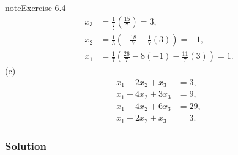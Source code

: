 \documentclass[letterpaper,10pt,english]{jupyterBook}
\begin{document}
\begin{sphinxadmonition}{note}{Exercise 6.4}
\begin{align*}
    x_{3} &= \frac{1}{\frac{5}{7}} (\frac{15}{7}) = 3, \\
    x_{2} &= \frac{1}{3} (- \frac{18}{7} - \frac{1}{7}(3)) = -1, \\
    x_{1} &= \frac{1}{7} (\frac{26}{7} - 8(-1) - \frac{11}{7}(3)) = 1.
\end{align*}
\sphinxAtStartPar
(c)
\begin{align*}
    x_1 + 2 x_2 +   x_3 &= 3,\\
    x_1 + 4 x_2 + 3 x_3 &= 9,\\
    x_1 - 4 x_2 + 6 x_3 &= 29,\\
    x_1 + 2 x_2 +   x_3 &= 3.
\end{align*}\subsubsection*{Solution}


\end{sphinxadmonition}
\end{document}
